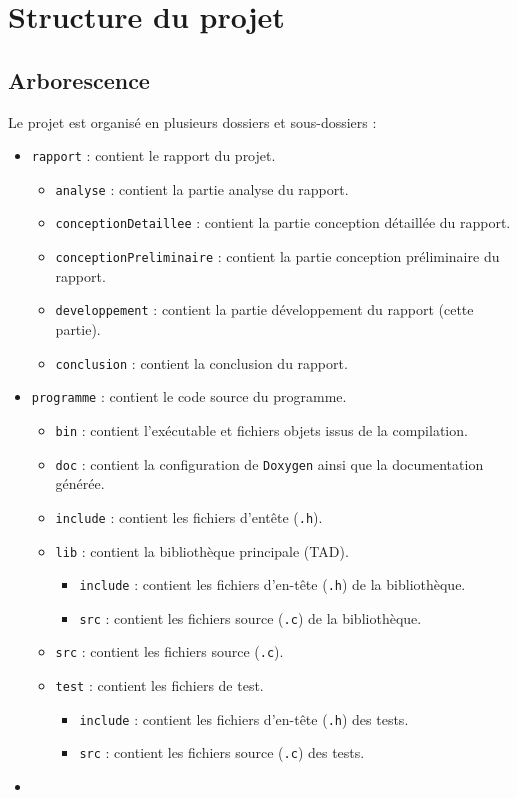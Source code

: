 \section{Structure du projet}

\subsection{Arborescence}

Le projet est organisé en plusieurs dossiers et sous-dossiers :

\begin{itemize}
    \item \texttt{rapport} : contient le rapport du projet.
    \begin{itemize}
        \item \texttt{analyse} : contient la partie analyse du rapport.
        \item \texttt{conceptionDetaillee} : contient la partie conception détaillée du rapport.
        \item \texttt{conceptionPreliminaire} : contient la partie conception préliminaire du rapport.
        \item \texttt{developpement} : contient la partie développement du rapport (cette partie).
        \item \texttt{conclusion} : contient la conclusion du rapport.
    \end{itemize}
    \item \texttt{programme} : contient le code source du programme.
    \begin{itemize}
        \item \texttt{bin} : contient l'exécutable et fichiers objets issus de la compilation.
        \item \texttt{doc} : contient la configuration de \texttt{Doxygen} ainsi que la documentation générée.
        \item \texttt{include} : contient les fichiers d'entête (\texttt{.h}).
        \item \texttt{lib} : contient la bibliothèque principale (TAD).
        \begin{itemize}
            \item \texttt{include} : contient les fichiers d'en-tête (\texttt{.h}) de la bibliothèque.
            \item \texttt{src} : contient les fichiers source (\texttt{.c}) de la bibliothèque. 
        \end{itemize}
        \item \texttt{src} : contient les fichiers source (\texttt{.c}).
        \item \texttt{test} : contient les fichiers de test.
        \begin{itemize}
            \item \texttt{include} : contient les fichiers d'en-tête (\texttt{.h}) des tests.
            \item \texttt{src} : contient les fichiers source (\texttt{.c}) des tests.
        \end{itemize}
    \end{itemize}
    \item 
\end{itemize}

